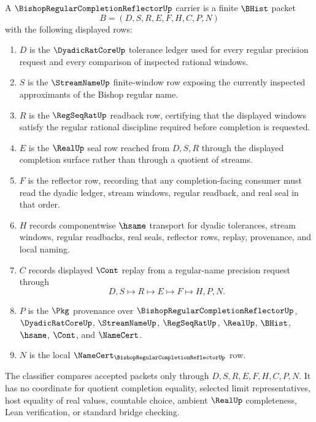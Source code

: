 \begin{definition}
\label{def:bishop-regular-completion-reflector-carrier}
A $\BishopRegularCompletionReflectorUp$ carrier is a finite $\BHist$ packet
$$
B=(D,S,R,E,F,H,C,P,N)
$$
with the following displayed rows:
\begin{enumerate}
\item $D$ is the $\DyadicRatCoreUp$ tolerance ledger used for every regular precision request and every comparison of inspected rational windows.
\item $S$ is the $\StreamNameUp$ finite-window row exposing the currently inspected approximants of the Bishop regular name.
\item $R$ is the $\RegSeqRatUp$ readback row, certifying that the displayed windows satisfy the regular rational discipline required before completion is requested.
\item $E$ is the $\RealUp$ seal row reached from $D,S,R$ through the displayed completion surface rather than through a quotient of streams.
\item $F$ is the reflector row, recording that any completion-facing consumer must read the dyadic ledger, stream windows, regular readback, and real seal in that order.
\item $H$ records componentwise $\hsame$ transport for dyadic tolerances, stream windows, regular readbacks, real seals, reflector rows, replay, provenance, and local naming.
\item $C$ records displayed $\Cont$ replay from a regular-name precision request through
$$
D,S \longmapsto R \longmapsto E \longmapsto F \longmapsto H,P,N .
$$
\item $P$ is the $\Pkg$ provenance over $\BishopRegularCompletionReflectorUp$, $\DyadicRatCoreUp$, $\StreamNameUp$, $\RegSeqRatUp$, $\RealUp$, $\BHist$, $\hsame$, $\Cont$, and $\NameCert$.
\item $N$ is the local $\NameCert_{\BishopRegularCompletionReflectorUp}$ row.
\end{enumerate}
The classifier compares accepted packets only through $D,S,R,E,F,H,C,P,N$. It has no coordinate for quotient completion equality, selected limit representatives, host equality of real values, countable choice, ambient $\RealUp$ completeness, Lean verification, or standard bridge checking.
\end{definition}

